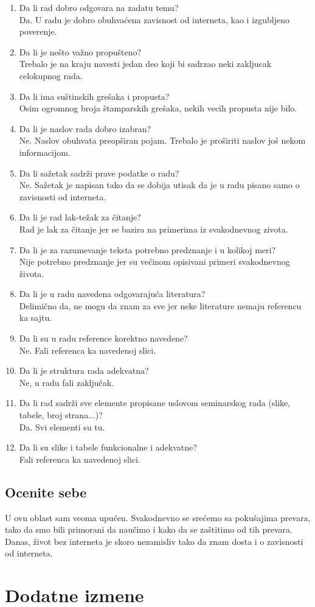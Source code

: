 \documentclass[a4paper]{report}
\begin{document}
\begin{enumerate}
\item Da li rad dobro odgovara na zadatu temu?\\
Da. U radu je dobro obuhvaćena zavisnost od interneta, kao i izgubljeno poverenje.
\item Da li je nešto važno propušteno?\\
Trebalo je na kraju navesti jedan deo koji bi sadrzao neki zakljucak celokupnog rada.
\item Da li ima suštinskih grešaka i propusta?\\
Osim ogromnog broja štamparskih grešaka, nekih vecih propusta nije bilo.
\item Da li je naslov rada dobro izabran?\\
Ne. Naslov obuhvata preopširan pojam. Trebalo je proširiti naslov još nekom informacijom. 
\item Da li sažetak sadrži prave podatke o radu?\\
Ne. Sažetak je napisan tako da se dobija utisak da je u radu pisano samo o zavisnosti od interneta.
\item Da li je rad lak-težak za čitanje?\\
Rad je lak za čitanje jer se bazira na primerima iz svakodnevnog zivota.
\item Da li je za razumevanje teksta potrebno predznanje i u kolikoj meri?\\
Nije potrebno predznanje jer su većinom opisivani primeri svakodnevnog života.
\item Da li je u radu navedena odgovarajuća literatura?\\
Delimično da, ne mogu da znam za sve jer neke literature nemaju referencu ka sajtu.
\item Da li su u radu reference korektno navedene?\\
Ne. Fali referenca ka navedenoj slici.
\item Da li je struktura rada adekvatna?\\
Ne, u radu fali zaključak.
\item Da li rad sadrži sve elemente propisane uslovom seminarskog rada (slike, tabele, broj strana...)?\\
Da. Svi elementi su tu.
\item Da li su slike i tabele funkcionalne i adekvatne?\\
Fali referenca ka navedenoj slici.
\end{enumerate}

\section{Ocenite sebe}
U ovu oblast sam veoma upućen. Svakodnevno se srećemo sa pokušajima prevara, tako da smo bili primorani da naučimo i kako da se zaštitimo od tih prevara. Danas, život bez interneta je skoro nezamisliv tako da znam dosta i o zavisnosti od interneta.


\chapter{Dodatne izmene}
\end{document}
